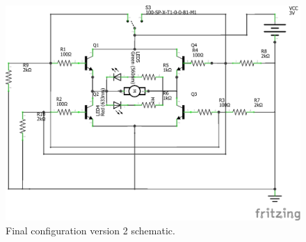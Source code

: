 \begin{figure}[b]
\centering
\includegraphics[width=\columnwidth]{img/ponteH_schem_new.png}
\caption{Final configuration version 2 schematic.}
\label{fig:h_schem_v2}
\end{figure}


